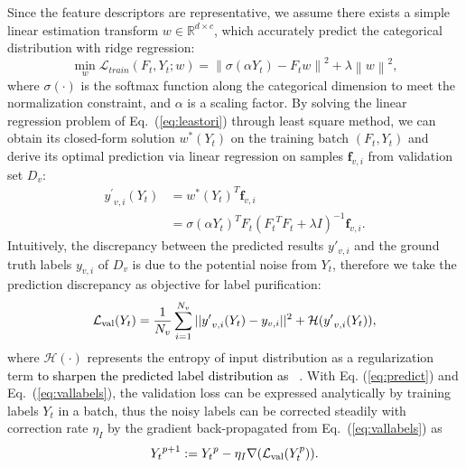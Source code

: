 \documentclass[10pt,twocolumn,letterpaper]{article}
\newcommand{\typ}[1]{\textcolor{black}{#1}}
\begin{document}
{Since the feature descriptors are representative, we assume there exists a simple linear estimation transform $w\in\mathbb{R}^{d\times c}$, which accurately predict the categorical distribution with ridge regression:}
\begin{equation}
\min_{w}\mathcal{L}_{train}(F_t,Y_t;w) = \left\|\sigma(\alpha Y_t)- F_{t}w\right\|^{2} + \lambda \left\|w\right\|^2,
\label{eq:leastori}
\end{equation}
where $\sigma(\cdot)$ is the softmax function along the categorical dimension to meet the normalization constraint, and $\alpha$ is a scaling factor. By {solving the linear regression problem of} Eq.~(\ref{eq:leastori}) through least square method, we can obtain its closed-form solution $w^{*}(Y_t)$ on the training {batch} $(F_t, Y_t)$ {and derive its optimal prediction via linear regression on samples $\mathbf{f}_{v,i}$} from validation set $D_{v}$:
\begin{align}\label{eq:predict}
{y^{\prime}}_{v,i}(Y_t) & = w^{*}(Y_t)^T\mathbf{f}_{v,i}\nonumber\\
                        & = \sigma(\alpha Y_t)^T{F_t}\left({F_t}^{T} {F_t} + \lambda I\right)^{-1}\mathbf{f}_{v,i}.
\end{align}
Intuitively, the discrepancy between the predicted results $y'_{v,i}$ and the ground truth labels $y_{v,i}$ of $D_v$ is due to the potential noise from $Y_t$, therefore we take the prediction discrepancy as objective for label purification:
\begin{equation}
{\mathcal{L}_{\rm val}}(Y_t)=\frac{1}{N_v}\sum_{i=1}^{N_v}{||{y^{\prime}}_{v,i}(Y_t)-y_{v,i}||^2+\mathcal{H}({y^{\prime}}_{v,i}(Y_t)),}
\label{eq:vallabels}
\end{equation}
{where $\mathcal{H}(\cdot)$ represents the entropy of input distribution as a regularization term \typ{to sharpen the predicted label distribution as ~\cite{yi2019probabilistic}}.} { With Eq. (\ref{eq:predict}) and Eq.~(\ref{eq:vallabels}), the validation loss can be expressed analytically by training labels $Y_t$ in a batch, thus} the noisy labels can be corrected steadily {with correction rate $\eta_I$ by} the gradient back-propagated {from} Eq.~(\ref{eq:vallabels}) as
\begin{equation}
    {Y_t}^{p+1}:={Y_t}^{p}-\eta_I\nabla({\mathcal{L}_{\rm val}}(Y^p_t)).
    \label{eq:update_eaca}
\end{equation}
\end{document}
